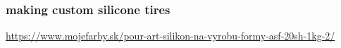 \documentclass{beamer}
\begin{document}
\begin{frame}
  
  \frametitle{\bf making custom silicone tires}
  \url{https://www.mojefarby.sk/pour-art-silikon-na-vyrobu-formy-asf-20sh-1kg-2/}


\end{frame}
\end{document}
